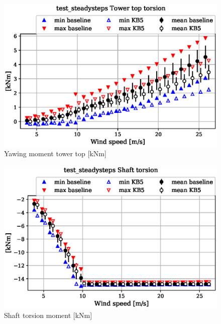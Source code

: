 \begin{figure}[!ht]
\begin{center}
	\includegraphics[width=.85\linewidth]{figures/baseline-vs-KB6/test_steadysteps/tower-tower-node-004-momentvec-z_AA0008_AA0008.eps}
\end{center}
\caption{Yawing moment tower top [kNm]}
\label{fig:baseline-vs-KB6:test_steadysteps:tower-top-yaw}
\end{figure}

\begin{figure}[!ht]
\begin{center}
	\includegraphics[width=.85\linewidth]{figures/baseline-vs-KB6/test_steadysteps/shaft-shaft-node-001-momentvec-z_AA0008_AA0008.eps}
\end{center}
\caption{Shaft torsion moment [kNm]}
\label{fig:baseline-vs-KB6:test_steadysteps:shaft-torsion}
\end{figure}

